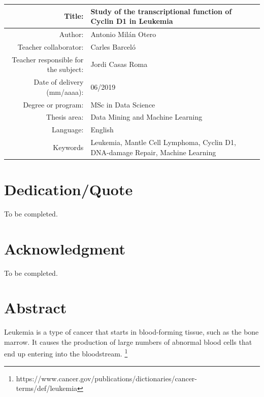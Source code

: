 \begin{table}[ht]
	\centering{}
	\renewcommand{\arraystretch}{2}
	\begin{tabular}{r | p{8cm}}
		\hline
		Title: & Study of the transcriptional function \newline of Cyclin D1 in Leukemia\\
		\hline
        Author: & Antonio Milán Otero\\
		\hline
        Teacher collaborator: & Carles Barceló\\
		\hline
        Teacher responsible for the subject: & Jordi Casas Roma\\
		\hline
        Date of delivery (mm/aaaa): & 06/2019\\
		\hline
        Degree or program: & MSc in Data Science\\
		\hline
        Thesis area: & Data Mining and Machine Learning\\
		\hline
        Language: & English\\
		\hline
        Keywords & Leukemia, Mantle Cell Lymphoma, Cyclin D1, DNA-damage Repair, Machine Learning\\
		\hline
	\end{tabular}
\end{table}

\chapter*{Dedication/Quote}

To be completed.

\chapter*{Acknowledgment}

To be completed.

\chapter*{Abstract}

\onehalfspacing

Leukemia is a type of cancer that starts in blood-forming tissue, such as the bone marrow. It causes the production of large numbers of abnormal blood cells that end up entering into the bloodstream. \footnote{https://www.cancer.gov/publications/dictionaries/cancer-terms/def/leukemia}

